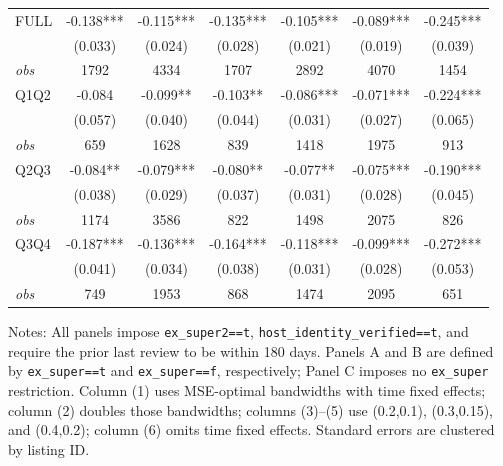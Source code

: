 \begin{table}[!htbp]
\begin{tabular}{lcccccc}
FULL & -0.138*** & -0.115*** & -0.135*** & -0.105*** & -0.089*** & -0.245*** \\
 & (0.033) & (0.024) & (0.028) & (0.021) & (0.019) & (0.039) \\
\textit{obs} & 1792 & 4334 & 1707 & 2892 & 4070 & 1454 \\
Q1Q2 & -0.084 & -0.099** & -0.103** & -0.086*** & -0.071*** & -0.224*** \\
 & (0.057) & (0.040) & (0.044) & (0.031) & (0.027) & (0.065) \\
\textit{obs} & 659 & 1628 & 839 & 1418 & 1975 & 913 \\
Q2Q3 & -0.084** & -0.079*** & -0.080** & -0.077** & -0.075*** & -0.190*** \\
 & (0.038) & (0.029) & (0.037) & (0.031) & (0.028) & (0.045) \\
\textit{obs} & 1174 & 3586 & 822 & 1498 & 2075 & 826 \\
Q3Q4 & -0.187*** & -0.136*** & -0.164*** & -0.118*** & -0.099*** & -0.272*** \\
 & (0.041) & (0.034) & (0.038) & (0.031) & (0.028) & (0.053) \\
\textit{obs} & 749 & 1953 & 868 & 1474 & 2095 & 651 \\
\bottomrule
\end{tabular}
\begin{minipage}{0.98\textwidth}\footnotesize
Notes: All panels impose \texttt{ex\_super2==t}, \texttt{host\_identity\_verified==t}, and require the prior last review to be within 180 days. Panels A and B are defined by \texttt{ex\_super==t} and \texttt{ex\_super==f}, respectively; Panel C imposes no \texttt{ex\_super} restriction. Column (1) uses MSE-optimal bandwidths with time fixed effects; column (2) doubles those bandwidths; columns (3)--(5) use (0.2,0.1), (0.3,0.15), and (0.4,0.2); column (6) omits time fixed effects. Standard errors are clustered by listing ID.
\end{minipage}
\end{table}
